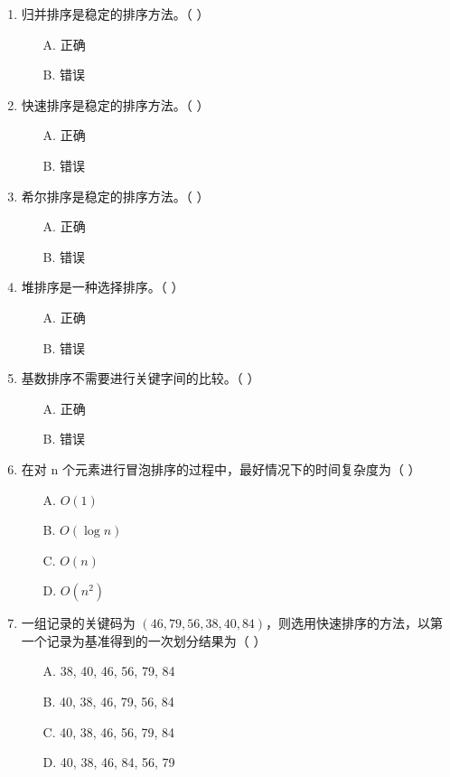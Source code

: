 \documentclass[12pt, a4paper]{article}
\begin{document}
\begin{enumerate}[label=\arabic*.]
	\item 归并排序是稳定的排序方法。（ ）
	      \begin{enumerate}
		      \item[A.] 正确
		      \item[B.] 错误
	      \end{enumerate}

	\item 快速排序是稳定的排序方法。（ ）
	      \begin{enumerate}
		      \item[A.] 正确
		      \item[B.] 错误
	      \end{enumerate}

	\item 希尔排序是稳定的排序方法。（ ）
	      \begin{enumerate}
		      \item[A.] 正确
		      \item[B.] 错误
	      \end{enumerate}

	\item 堆排序是一种选择排序。（ ）
	      \begin{enumerate}
		      \item[A.] 正确
		      \item[B.] 错误
	      \end{enumerate}

	\item 基数排序不需要进行关键字间的比较。（ ）
	      \begin{enumerate}
		      \item[A.] 正确
		      \item[B.] 错误
	      \end{enumerate}

	\item 在对 n 个元素进行冒泡排序的过程中，最好情况下的时间复杂度为（ ）
	      \begin{enumerate}
		      \item[A.] $O(1)$
		      \item[B.] $O(\log n)$
		      \item[C.] $O(n)$
		      \item[D.] $O(n^2)$
	      \end{enumerate}

	\item 一组记录的关键码为 $(46, 79, 56, 38, 40, 84)$，则选用快速排序的方法，以第一个记录为基准得到的一次划分结果为（ ）
	      \begin{enumerate}
		      \item[A.] 38, 40, 46, 56, 79, 84
		      \item[B.] 40, 38, 46, 79, 56, 84
		      \item[C.] 40, 38, 46, 56, 79, 84
		      \item[D.] 40, 38, 46, 84, 56, 79
	      \end{enumerate}


\end{enumerate}
\end{document}
